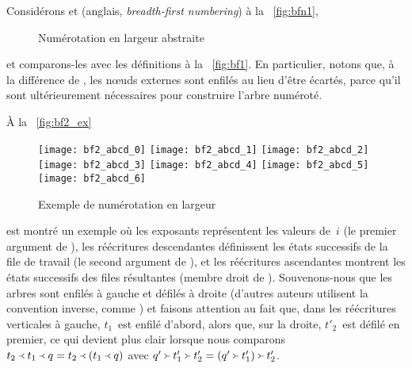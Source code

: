 Considérons  et
 (anglais,
\emph{breadth-first numbering}) à la \fig~\vref{fig:bfn1},
\begin{figure}
\abovedisplayskip=0pt
\belowdisplayskip=0pt
\centering
{}
\caption{Numérotation en largeur abstraite}
\label{fig:bfn1}
\end{figure}
et comparons-les avec les définitions à la \fig~\vref{fig:bf1}. En
particulier, notons que, à la différence de
, les nœuds externes
sont enfilés au lieu d'être écartés, parce qu'il sont ultérieurement
nécessaires pour construire l'arbre numéroté.

À la \fig~\vref{fig:bf2_ex}
\begin{figure}[t]
\centering
\texttt{[image: bf2\_abcd\_0]}
\texttt{[image: bf2\_abcd\_1]}
\texttt{[image: bf2\_abcd\_2]}
\texttt{[image: bf2\_abcd\_3]}
\texttt{[image: bf2\_abcd\_4]}
\texttt{[image: bf2\_abcd\_5]}
\texttt{[image: bf2\_abcd\_6]}
\caption{Exemple de numérotation en largeur}
\label{fig:bf2_ex}
\end{figure}
est montré un exemple où les exposants représentent les valeurs
de~\(i\) (le premier argument de
), les réécritures
descendantes définissent les états successifs de la file de travail
(le second argument de ),
et les réécritures ascendantes montrent les états successifs des files
résultantes (membre droit de
). Souvenons-nous que les
arbres sont enfilés à gauche et défilés à droite (d'autres auteurs
utilisent la convention inverse, comme \cite{Okasaki_2000}) et faisons
attention au fait que, dans les réécritures verticales à gauche,
\(t_1\)~est enfilé d'abord, alors que, sur la droite, \(t'_2\)~est
défilé en premier, ce qui devient plus clair lorsque nous comparons
\(\enq{t_2}{\enq{t_1}{q}} =
\enq{t_2}{(\enq{t_1}{q})}\) avec
\(\deq{t'_2}{\deq{t'_1}{q'}} =
\deq{t'_2}{(\deq{t'_1}{q'})}\).


